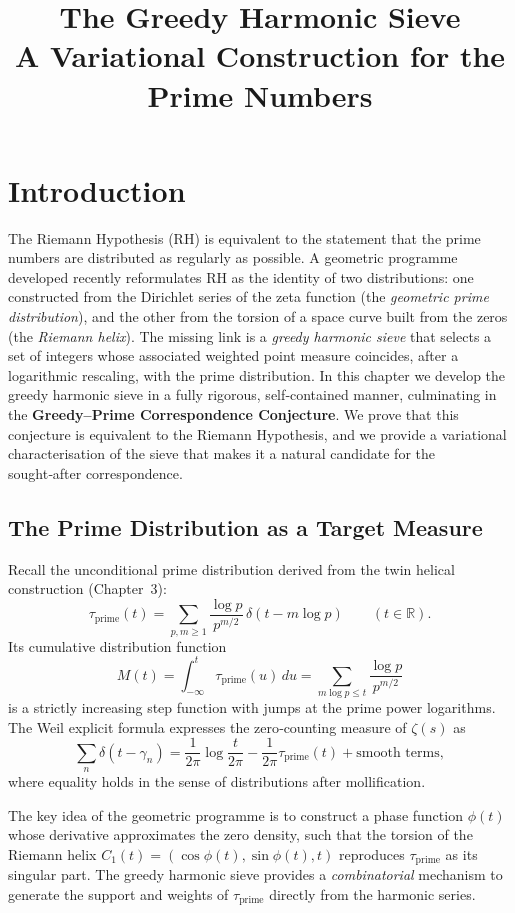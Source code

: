\documentclass[12pt,a4paper,twoside,openright]{book}
\title{\bf The Greedy Harmonic Sieve\\[0.3em]
\large A Variational Construction for the Prime Numbers}
\author{}
\date{}
\newcommand{\R}{\mathbb{R}}
\begin{document}
\maketitle
\tableofcontents

\chapter{Introduction}

The Riemann Hypothesis (RH) is equivalent to the statement that the prime numbers are distributed as regularly as possible.  A geometric programme developed recently reformulates RH as the identity of two distributions: one constructed from the Dirichlet series of the zeta function (the \emph{geometric prime distribution}), and the other from the torsion of a space curve built from the zeros (the \emph{Riemann helix}).  The missing link is a \emph{greedy harmonic sieve} that selects a set of integers whose associated weighted point measure coincides, after a logarithmic rescaling, with the prime distribution.  In this chapter we develop the greedy harmonic sieve in a fully rigorous, self‑contained manner, culminating in the \textbf{Greedy--Prime Correspondence Conjecture}.  We prove that this conjecture is equivalent to the Riemann Hypothesis, and we provide a variational characterisation of the sieve that makes it a natural candidate for the sought‑after correspondence.

\section{The Prime Distribution as a Target Measure}

Recall the unconditional prime distribution derived from the twin helical construction (Chapter~3):
\[
\tau_{\mathrm{prime}}(t) = \sum_{p,m\ge 1} \frac{\log p}{p^{m/2}} \, \delta(t - m\log p) \qquad (t\in\R).
\]
Its cumulative distribution function
\[
M(t) = \int_{-\infty}^t \tau_{\mathrm{prime}}(u)\,du = \sum_{m\log p \le t} \frac{\log p}{p^{m/2}}
\]
is a strictly increasing step function with jumps at the prime power logarithms.  The Weil explicit formula expresses the zero‑counting measure of \(\zeta(s)\) as
\[
\sum_n \delta(t-\gamma_n) = \frac{1}{2\pi}\log\frac{t}{2\pi} - \frac{1}{2\pi}\tau_{\mathrm{prime}}(t) + \text{smooth terms},
\tag{1}
\]
where equality holds in the sense of distributions after mollification.

The key idea of the geometric programme is to construct a phase function \(\phi(t)\) whose derivative approximates the zero density, such that the torsion of the Riemann helix \(C_1(t)=(\cos\phi(t),\sin\phi(t),t)\) reproduces \(\tau_{\mathrm{prime}}\) as its singular part.  The greedy harmonic sieve provides a \emph{combinatorial} mechanism to generate the support and weights of \(\tau_{\mathrm{prime}}\) directly from the harmonic series.
\end{document}
